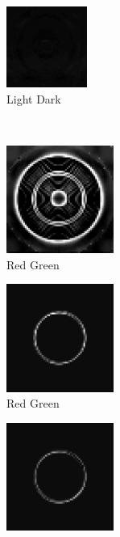\documentclass[journal,onecolumn]{IEEEtran}
\begin{document}
{\begin{figure}[H]
\begin{subfigure}[b]{0.25\textwidth}
    \end{subfigure}%
    \begin{subfigure}[b]{0.25\textwidth}
            \centering
            \includegraphics[width=100px, frame]{test-circle-a2-opp-ld}
            \caption{Light Dark}
            \label{fig:test-circle-a2-opp-ld}
    \end{subfigure}\\
    \begin{subfigure}[b]{0.25\textwidth}
            \centering
            \includegraphics[width=100pt, frame]{test-circle-a1-opp-rg}
            \caption{Red Green}
            \label{fig:test-circle-a1-opp-rg}
    \end{subfigure}%
    \begin{subfigure}[b]{0.25\textwidth}
            \centering
            \includegraphics[width=100pt, frame]{test-circle-a1-opp-rg-mask}
            \caption{Red Green}
            \label{fig:test-circle-a1-opp-rg-mask}
    \end{subfigure}%
    \begin{subfigure}[b]{0.25\textwidth}
            \centering
            \includegraphics[width=100pt, frame]{test-circle-a2-opp-rg-mask}

\end{subfigure}
\end{figure}}
\end{document}

